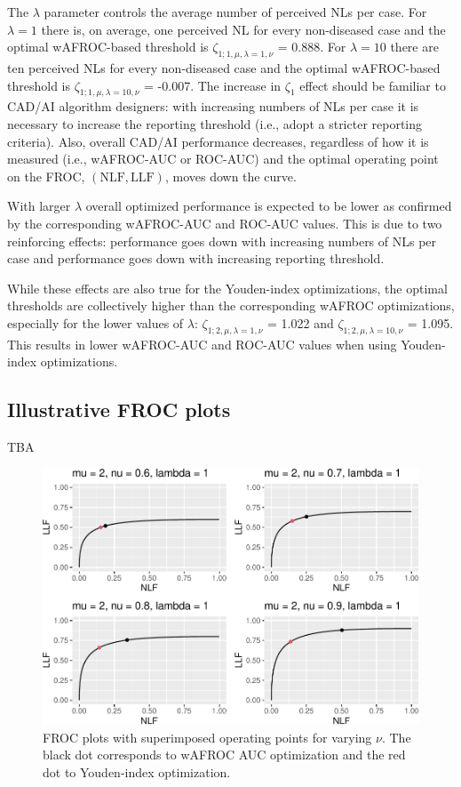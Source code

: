 \documentclass[
]{book}
\begin{document}
The \(\lambda\) parameter controls the average number of perceived NLs per case. For \(\lambda = 1\) there is, on average, one perceived NL for every non-diseased case and the optimal wAFROC-based threshold is \(\zeta_{1;1,\mu, \lambda = 1, \nu}\) = 0.888. For \(\lambda = 10\) there are ten perceived NLs for every non-diseased case and the optimal wAFROC-based threshold is \(\zeta_{1;1,\mu, \lambda = 10, \nu}\) = -0.007. The increase in \(\zeta_1\) effect should be familiar to CAD/AI algorithm designers: with increasing numbers of NLs per case it is necessary to increase the reporting threshold (i.e., adopt a stricter reporting criteria). Also, overall CAD/AI performance decreases, regardless of how it is measured (i.e., wAFROC-AUC or ROC-AUC) and the optimal operating point on the FROC, \(\left( \text{NLF}, \text{LLF}\right)\), moves down the curve.

With larger \(\lambda\) overall optimized performance is expected to be lower as confirmed by the corresponding wAFROC-AUC and ROC-AUC values. This is due to two reinforcing effects: performance goes down with increasing numbers of NLs per case and performance goes down with increasing reporting threshold.

While these effects are also true for the Youden-index optimizations, the optimal thresholds are collectively higher than the corresponding wAFROC optimizations, especially for the lower values of \(\lambda\): \(\zeta_{1;2,\mu, \lambda = 1, \nu}\) = 1.022 and \(\zeta_{1;2,\mu, \lambda = 10, \nu}\) = 1.095. This results in lower wAFROC-AUC and ROC-AUC values when using Youden-index optimizations.

\hypertarget{illustrative-froc-plots}{%
\subsection{Illustrative FROC plots}\label{illustrative-froc-plots}}

TBA

\begin{figure}
\centering
\includegraphics{21-optim-op-point_files/figure-latex/optim-op-point-vary-nu-froc-1.pdf}
\caption{\label{fig:optim-op-point-vary-nu-froc}FROC plots with superimposed operating points for varying \(\nu\). The black dot corresponds to wAFROC AUC optimization and the red dot to Youden-index optimization.}
\end{figure}
\end{document}
